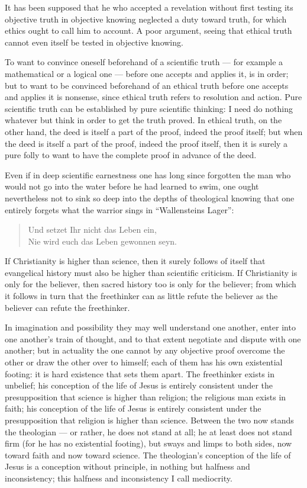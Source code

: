 \documentclass[12pt,a4paper]{book}
\begin{document}
It has been supposed that he who accepted a revelation without first testing its objective
truth in objective knowing neglected a duty toward truth, for which ethics ought to call him
to account. A poor argument, seeing that ethical truth cannot even itself be tested in
objective knowing.

To want to convince oneself beforehand of a scientific truth --- for example a mathematical
or a logical one --- before one accepts and applies it, is in order; but to want to be
convinced beforehand of an ethical truth before one accepts and applies it is nonsense,
since ethical truth refers to resolution and action. Pure scientific truth can be
established by pure scientific thinking: I need do nothing whatever but think in order to
get the truth proved. In ethical truth, on the other hand, the deed is itself a part of the
proof, indeed the proof itself; but when the deed is itself a part of the proof, indeed the
proof itself, then it is surely a pure folly to want to have the complete proof in advance
of the deed.

Even if in deep scientific earnestness one has long since forgotten the man who would not go
into the water before he had learned to swim, one ought nevertheless not to sink so deep
into the depths of theological knowing that one entirely forgets what the warrior sings in
``Wallensteins Lager'':

\begin{quote}
Und setzet Ihr nicht das Leben ein,\\
Nie wird euch das Leben gewonnen seyn.
\end{quote}

If Christianity is higher than science, then it surely follows of itself that evangelical
history must also be higher than scientific criticism. If Christianity is only for the
believer, then sacred history too is only for the believer; from which it follows in turn
that the freethinker can as little refute the believer as the believer can refute the
freethinker.

In imagination and possibility they may well understand one another, enter into one
another's train of thought, and to that extent negotiate and
dispute with one another; but in actuality the one cannot by any objective proof overcome
the other or draw the other over to himself; each of them has his own existential footing:
it is hard existence that sets them apart. The freethinker exists in unbelief; his
conception of the life of Jesus is entirely consistent under the presupposition that
science is higher than religion; the religious man exists in faith; his conception of the
life of Jesus is entirely consistent under the presupposition that religion is higher than
science. Between the two now stands the theologian --- or rather, he does not stand at all;
he at least does not stand firm (for he has no existential footing), but sways and limps to
both sides, now toward faith and now toward science. The theologian's conception of the
life of Jesus is a conception without principle, in nothing but halfness and inconsistency;
this halfness and inconsistency I call mediocrity.
\end{document}
